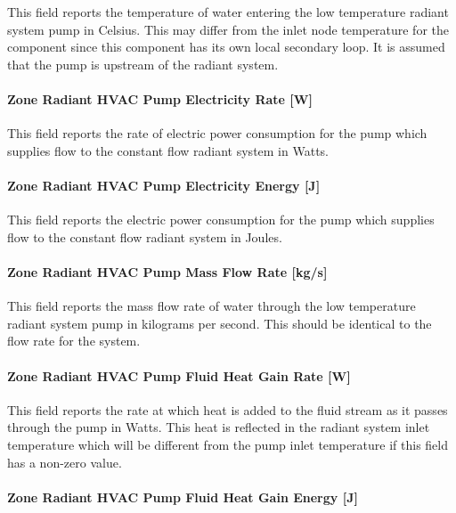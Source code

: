 This field reports the temperature of water entering the low temperature radiant system pump in Celsius. This may differ from the inlet node temperature for the component since this component has its own local secondary loop. It is assumed that the pump is upstream of the radiant system.

\paragraph{Zone Radiant HVAC Pump Electricity Rate {[}W{]}}\label{zone-radiant-hvac-pump-electric-power-w}

This field reports the rate of electric power consumption for the pump which supplies flow to the constant flow radiant system in Watts.

\paragraph{Zone Radiant HVAC Pump Electricity Energy {[}J{]}}\label{zone-radiant-hvac-pump-electric-energy-j}

This field reports the electric power consumption for the pump which supplies flow to the constant flow radiant system in Joules.

\paragraph{Zone Radiant HVAC Pump Mass Flow Rate {[}kg/s{]}}\label{zone-radiant-hvac-pump-mass-flow-rate-kgs}

This field reports the mass flow rate of water through the low temperature radiant system pump in kilograms per second. This should be identical to the flow rate for the system.

\paragraph{Zone Radiant HVAC Pump Fluid Heat Gain Rate {[}W{]}}\label{zone-radiant-hvac-pump-fluid-heat-gain-rate-w}

This field reports the rate at which heat is added to the fluid stream as it passes through the pump in Watts. This heat is reflected in the radiant system inlet temperature which will be different from the pump inlet temperature if this field has a non-zero value.

\paragraph{Zone Radiant HVAC Pump Fluid Heat Gain Energy {[}J{]}}\label{zone-radiant-hvac-pump-fluid-heat-gain-energy-j}

